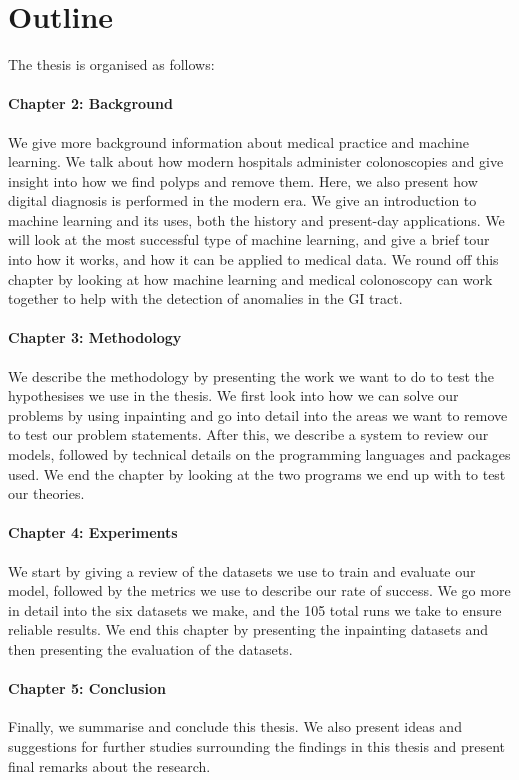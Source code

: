\section{Outline}
The thesis is organised as follows:

\paragraph{Chapter 2: Background}
We give more background information about medical practice and machine learning.
We talk about how modern hospitals administer colonoscopies and give insight into how we find polyps and remove them. Here, we also present how digital diagnosis is performed in the modern era.  
We give an introduction to machine learning and its uses, both the history and present-day applications. We will look at the most successful type of machine learning, and give a brief tour into how it works, and how it can be applied to medical data.
We round off this chapter by looking at how machine learning and medical colonoscopy can work together to help with the detection of anomalies in the GI tract.

\paragraph{Chapter 3: Methodology }
We describe the methodology by presenting the work we want to do to test the hypothesises we use in the thesis.
We first look into how we can solve our problems by using inpainting and go into detail into the areas we want to remove to test our problem statements. 
After this, we describe a system to review our models, followed by technical details on the programming languages and packages used.
We end the chapter by looking at the two programs we end up with to test our theories. 

\paragraph{Chapter 4: Experiments}
We start by giving a review of the datasets we use to train and evaluate our model, followed by the metrics we use to describe our rate of success.
We go more in detail into the six datasets we make, and the 105 total runs we take to ensure reliable results.
We end this chapter by presenting the inpainting datasets and then presenting the evaluation of the datasets.


\paragraph{Chapter 5: Conclusion}
Finally, we summarise and conclude this thesis.
We also present ideas and suggestions for further studies surrounding
the findings in this thesis and present final remarks about the research.


